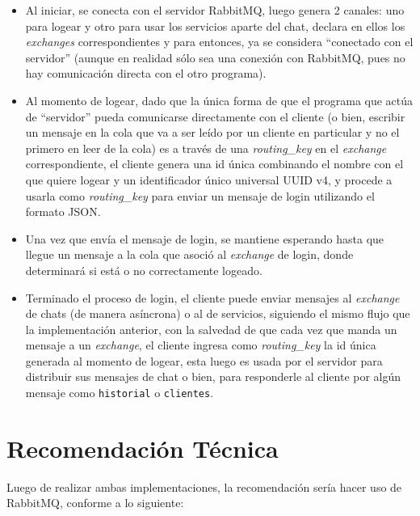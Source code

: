 \documentclass[11pt, letter]{article}
\begin{document}
\begin{itemize}
	\item Al iniciar, se conecta con el servidor RabbitMQ, luego genera 2 canales: uno para logear y otro para usar los servicios aparte del chat, declara en ellos los \textit{exchanges} correspondientes y para entonces, ya se considera ``conectado con el servidor'' (aunque en realidad sólo sea una conexión con RabbitMQ, pues no hay comunicación directa con el otro programa).
	\item Al momento de logear, dado que la única forma de que el programa que actúa de ``servidor'' pueda comunicarse directamente con el cliente (o bien, escribir un mensaje en la cola que va a ser leído por un cliente en particular y no el primero en leer de la cola) es a través de una \textit{routing\_key} en el \textit{exchange} correspondiente, el cliente genera una id única combinando el nombre con el que quiere logear y un identificador único universal UUID v4\cite{RFC4122}, y procede a usarla como \textit{routing\_key} para enviar un mensaje de login utilizando el formato JSON\cite{RFC8259}.
	\item Una vez que envía el mensaje de login, se mantiene esperando hasta que llegue un mensaje a la cola que asoció al \textit{exchange} de login, donde determinará si está o no correctamente logeado.
	\item Terminado el proceso de login, el cliente puede enviar mensajes al \textit{exchange} de chats (de manera asíncrona) o al de servicios, siguiendo el mismo flujo que la implementación anterior, con la salvedad de que cada vez que manda un mensaje a un \textit{exchange}, el cliente ingresa como \textit{routing\_key} la id única generada al momento de logear, esta luego es usada por el servidor para distribuir sus mensajes de chat o bien, para responderle al cliente por algún mensaje como \texttt{historial} o \texttt{clientes}.
\end{itemize}

\section{Recomendación Técnica}

Luego de realizar ambas implementaciones, la recomendación sería hacer uso de RabbitMQ, conforme a lo siguiente:
\end{document}
